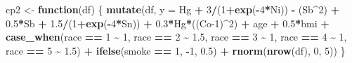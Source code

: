 \documentclass[12pt, twoside]{amherstthesis}
\newenvironment{Shaded}{\begin{snugshade}}{\end{snugshade}}
\newcommand{\AttributeTok}[1]{\textcolor[rgb]{0.13,0.29,0.53}{#1}}
\newcommand{\ControlFlowTok}[1]{\textcolor[rgb]{0.13,0.29,0.53}{\textbf{#1}}}
\newcommand{\DecValTok}[1]{\textcolor[rgb]{0.00,0.00,0.81}{#1}}
\newcommand{\FloatTok}[1]{\textcolor[rgb]{0.00,0.00,0.81}{#1}}
\newcommand{\FunctionTok}[1]{\textcolor[rgb]{0.13,0.29,0.53}{\textbf{#1}}}
\newcommand{\NormalTok}[1]{#1}
\newcommand{\OtherTok}[1]{\textcolor[rgb]{0.56,0.35,0.01}{#1}}
\newcommand{\SpecialCharTok}[1]{\textcolor[rgb]{0.81,0.36,0.00}{\textbf{#1}}}
\begin{document}
\begin{Shaded}
\begin{Highlighting}[]
\NormalTok{cp2 }\OtherTok{\textless{}{-}} \ControlFlowTok{function}\NormalTok{(df) \{}
  \FunctionTok{mutate}\NormalTok{(df, }\AttributeTok{y =} 
\NormalTok{           Hg }\SpecialCharTok{+} \DecValTok{3}\SpecialCharTok{/}\NormalTok{(}\DecValTok{1}\SpecialCharTok{+}\FunctionTok{exp}\NormalTok{(}\SpecialCharTok{{-}}\DecValTok{4}\SpecialCharTok{*}\NormalTok{Ni)) }\SpecialCharTok{{-}}\NormalTok{ (Sb}\SpecialCharTok{\^{}}\DecValTok{2}\NormalTok{) }\SpecialCharTok{+} \FloatTok{0.5}\SpecialCharTok{*}\NormalTok{Sb }\SpecialCharTok{+} \FloatTok{1.5}\SpecialCharTok{/}\NormalTok{(}\DecValTok{1}\SpecialCharTok{+}\FunctionTok{exp}\NormalTok{(}\SpecialCharTok{{-}}\DecValTok{4}\SpecialCharTok{*}\NormalTok{Sn)) }\SpecialCharTok{+} 
           \FloatTok{0.3}\SpecialCharTok{*}\NormalTok{Hg}\SpecialCharTok{*}\NormalTok{((Co}\DecValTok{{-}1}\NormalTok{)}\SpecialCharTok{\^{}}\DecValTok{2}\NormalTok{) }\SpecialCharTok{+}
\NormalTok{           age }\SpecialCharTok{+} \FloatTok{0.5}\SpecialCharTok{*}\NormalTok{bmi }\SpecialCharTok{+} 
           \FunctionTok{case\_when}\NormalTok{(race }\SpecialCharTok{==} \DecValTok{1} \SpecialCharTok{\textasciitilde{}} \DecValTok{1}\NormalTok{, }
\NormalTok{                     race }\SpecialCharTok{==} \DecValTok{2} \SpecialCharTok{\textasciitilde{}} \FloatTok{1.5}\NormalTok{, }
\NormalTok{                     race }\SpecialCharTok{==} \DecValTok{3} \SpecialCharTok{\textasciitilde{}} \DecValTok{1}\NormalTok{, }
\NormalTok{                     race }\SpecialCharTok{==} \DecValTok{4} \SpecialCharTok{\textasciitilde{}} \DecValTok{1}\NormalTok{, }
\NormalTok{                     race }\SpecialCharTok{==} \DecValTok{5} \SpecialCharTok{\textasciitilde{}} \FloatTok{1.5}\NormalTok{) }\SpecialCharTok{+}
           \FunctionTok{ifelse}\NormalTok{(smoke }\SpecialCharTok{==} \DecValTok{1}\NormalTok{, }\SpecialCharTok{{-}}\DecValTok{1}\NormalTok{, }\FloatTok{0.5}\NormalTok{) }\SpecialCharTok{+}
           \FunctionTok{rnorm}\NormalTok{(}\FunctionTok{nrow}\NormalTok{(df), }\DecValTok{0}\NormalTok{, }\DecValTok{5}\NormalTok{))}
\NormalTok{\}}


\end{Highlighting}
\end{Shaded}
\end{document}
